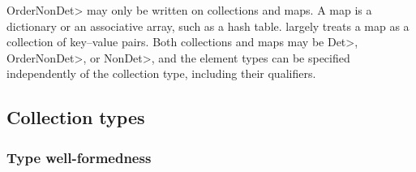 \<OrderNonDet> may only be written on collections and maps.
A map is a dictionary or an associative array, such as a hash table.
\OurTypeSystem largely treats a map as a collection of key--value pairs.
Both collections and maps may be \<Det>, \<OrderNonDet>, or \<NonDet>, and
the element types can be specified independently of the collection type,
including their qualifiers.



\subsection{Collection types}\label{collection-rules}

\subsubsection{Type well-formedness}


